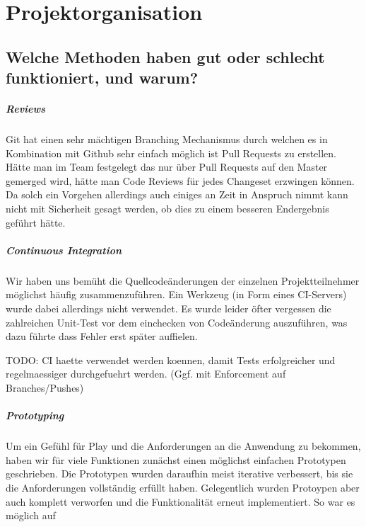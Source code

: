\documentclass[12pt,DIV14,BCOR10mm,a4paper,parskip=half-,headsepline,headinclude,english,ngerman,bibliography=totocnumbered]{scrreprt}
\begin{document}
\vspace*{-3cm}

\tableofcontents  %

\chapter{Projektorganisation}


\section{Welche Methoden haben gut oder schlecht funktioniert, und warum?}

\paragraph{Reviews}
Git hat einen sehr mächtigen Branching Mechanismus durch welchen es in Kombination mit Github sehr einfach möglich ist Pull Requests zu erstellen. Hätte man im Team festgelegt das nur über Pull Requests auf den Master gemerged wird, hätte man Code Reviews für jedes Changeset erzwingen können. Da solch ein Vorgehen allerdings auch einiges an Zeit in Anspruch nimmt kann nicht mit Sicherheit gesagt werden, ob dies zu einem besseren Endergebnis geführt hätte.

\paragraph{Continuous Integration}
Wir haben uns bemüht die Quellcodeänderungen der einzelnen Projektteilnehmer möglichst häufig zusammenzuführen. Ein Werkzeug (in Form eines CI-Servers) wurde dabei allerdings nicht verwendet. Es wurde leider öfter vergessen die zahlreichen Unit-Test vor dem einchecken von Codeänderung auszuführen, was dazu führte dass Fehler erst später auffielen.

 
TODO: CI haette verwendet werden koennen, damit Tests erfolgreicher und regelmaessiger durchgefuehrt werden. (Ggf. mit Enforcement auf Branches/Pushes)

\paragraph{Prototyping}
Um ein Gefühl für Play und die Anforderungen an die Anwendung zu bekommen, haben wir für viele Funktionen zunächst einen möglichst einfachen Prototypen geschrieben. Die Prototypen wurden daraufhin meist iterative verbessert, bis sie die Anforderungen vollständig erfüllt haben. Gelegentlich wurden Protoypen aber auch komplett verworfen und die Funktionalität erneut implementiert. So war es möglich auf 
\end{document}
